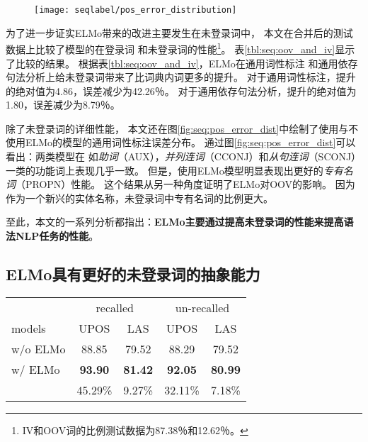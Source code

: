 \begin{figure}[t]
	\texttt{[image: seqlabel/pos\_error\_distribution]}
\end{figure}

为了进一步证实ELMo带来的改进主要发生在未登录词中，
本文在合并后的测试数据上比较了模型的在登录词
和未登录词的性能\footnote{IV和OOV词的比例测试数据为87.38％和12.62％。}。
表\ref {tbl:seq:oov_and_iv}显示了比较的结果。
根据表\ref{tbl:seq:oov_and_iv}，ELMo在通用词性标注
和通用依存句法分析上给未登录词带来了比词典内词更多的提升。
对于通用词性标注，提升的绝对值为4.86，误差减少为42.26％。
对于通用依存句法分析，提升的绝对值为1.80，误差减少为8.79％。

除了未登录词的详细性能，
本文还在图\ref {fig:seq:pos_error_dist}中绘制了使用与不使用ELMo的模型的通用词性标注误差分布。
通过图\ref{fig:seq:pos_error_dist}可以看出：两类模型在
如\textit{助词}（AUX），\textit{并列连词}（CCONJ）和\textit{从句连词}（SCONJ）
一类的功能词上表现几乎一致。
但是，使用ELMo模型明显表现出更好的\textit{专有名词}（PROPN）性能。
这个结果从另一种角度证明了ELMo对OOV的影响。
因为作为一个新兴的实体名称，未登录词中专有名词的比例更大。

至此，本文的一系列分析都指出：\textbf{ELMo主要通过提高未登录词的性能来提高语法NLP任务的性能}。

\subsection{ELMo具有更好的未登录词的抽象能力}\label{sec:seq:abstration}
\begin{table}[t]
	\vspace{0.5em}\centering\wuhao
	\begin{tabular}{lcc cc}
		\toprule[1.5pt]
		& \multicolumn{2}{c}{recalled} & \multicolumn{2}{c}{un-recalled}  \\
		models & UPOS & LAS & UPOS & LAS  \\
		\midrule[1pt]
		w/o ELMo & 88.85 & 79.52 & 88.29 & 79.52 \\
		w/ ELMo & \textbf{93.90} &  \textbf{81.42} & \textbf{92.05} & \textbf{80.99} \\
		& 45.29\% & 9.27\% & 32.11\% & 7.18\% \\
		\bottomrule[1.5pt]
	\end{tabular}
\end{table}

